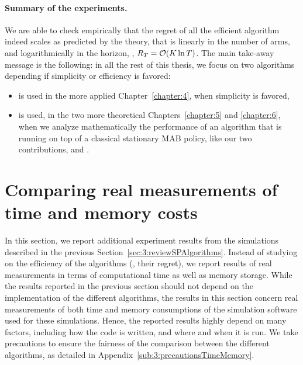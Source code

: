 \paragraph{Summary of the experiments.}
%
We are able to check empirically that the regret of all the efficient algorithm indeed scales as predicted by the theory, that is
linearly in the number of arms, and logarithmically in the horizon, \ie, $R_T = \mathop{}\mathopen{}\mathcal{O}\mathopen{}\left(K \ln T\right)$.
%
The main take-away message is the following: in all the rest of this thesis, we focus on two algorithms depending if simplicity or efficiency is favored:
\begin{itemize}%
    \item
    \UCB{} is used in the more applied Chapter~\ref{chapter:4}, when simplicity is favored,
    \item
    \klUCB{} is used, in the two more theoretical Chapters~\ref{chapter:5} and \ref{chapter:6}, when we analyze mathematically the performance of an algorithm that is running on top of a classical stationary MAB policy, like our two contributions, \MCTopM{} and \GLR.
\end{itemize}



\section{Comparing real measurements of time and memory costs}
\label{sec:3:timeAndMemoryCosts}

In this section, we report additional experiment results from the simulations described in the previous Section~\ref{sec:3:reviewSPAlgorithms}.
Instead of studying on the efficiency of the algorithms (\ie, their regret), we report results of real measurements in terms of computational time as well as memory storage.
%
%
While the results reported in the previous section should not depend on the implementation of the different algorithms, the results in this section concern real measurements of both time and memory consumptions of the simulation software used for these simulations.
Hence, the reported results highly depend on many factors, including how the code is written, and where and when it is run.
We take precautions to ensure the fairness of the comparison between the different algorithms, as detailed in Appendix~\ref{sub:3:precautionsTimeMemory}.


